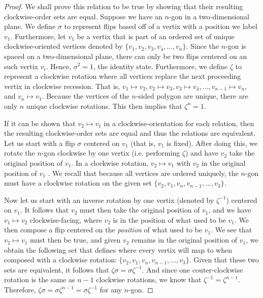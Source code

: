 \documentclass[a4paper,12pt]{article}
\begin{document}
\begin{proof}
    We shall prove this relation to be true by showing that their resulting  clockwise-order sets are equal. Suppose we have an $n$-gon in a two-dimensional plane. We define $\sigma$ to represent flips based off of a vertix with a position we label $v_1$. Furthermore, let $v_1$ be a vertix that is part of an ordered set of unique clockwise-oriented vertices denoted by  $\{v_1, v_2, v_3, v_4, \ldots, v_n\}$. Since the $n$-gon is spaced on a two-dimensional plane, there can only be two flips centered on an such vertix $v_i$. Hence, $\sigma ^2 = 1$, the identity state. Furthermore, we define $\zeta$ to represent a clockwise rotation where all vertices replace the next proceeding vertix in clockwise recession. That is, $v_1 \mapsto v_2, v_2 \mapsto v_3, v_3 \mapsto v_4, \ldots, v_{n-1} \mapsto v_n,$ and $v_n \mapsto v_1$. Because the vertices of the $n$-sided polygon are unique, there are only $n$ unique clockwise rotations. This then implies that $\zeta ^ n = 1$. 

    If it can be shown that $v_2 \mapsto v_1$ in a clockwise-orientation for each relation, then the resulting clockwise-order sets are equal and thus the relations are equivalent. Let us start with a flip $\sigma$ centered on $v_1$ (that is, $v_1$ is fixed). After doing this, we rotate the $n$-gon clockwise by one vertix (i.e. performing $\zeta$) and have $v_2$ take the original position of $v_1$. In a clockwise rotation, $v_2 \mapsto v_1$ with $v_2$ in the original position of $v_1$ . We recall that because all vertices are ordered uniquely, the $n$-gon must have a clockwise rotation on the given set $\{v_2, v_1, v_n, v_{n-1}, \ldots, v_3\}$.

    Now let us start with an inverse rotation by one vertix (denoted by $\zeta ^{-1}$) centered on $v_1$. It follows that $v_2$ must then take the original position of $v_1$, and we have  $v_1 \mapsto v_2$ clockwise-facing,  where $v_2$ is in the position of what used to be $v_1$.
    We then compose a flip centered on the \textit{position} of what used to be $v_1$. We see that $v_2 \mapsto v_1$ must then be true, and given $v_2$ remains in the original position of $v_1$, we obtain the following set that defines where every vertix will map to when composed with a clockwise rotation: $\{v_2, v_1, v_n, v_{n-1}, \ldots, v_3\}$. Given that these two sets are equivalent, it follows that $\zeta \sigma = \sigma \zeta^{-1}$. And since one couter-clockwise rotation is the same as $n-1$ clockwise rotations, we know that $\zeta^{-1} = \zeta^{n-1}$. Therefore, $\zeta \sigma = \sigma \zeta^{n-1} = \sigma \zeta^{-1}$ for any $n$-gon.



\end{proof}
\end{document}
